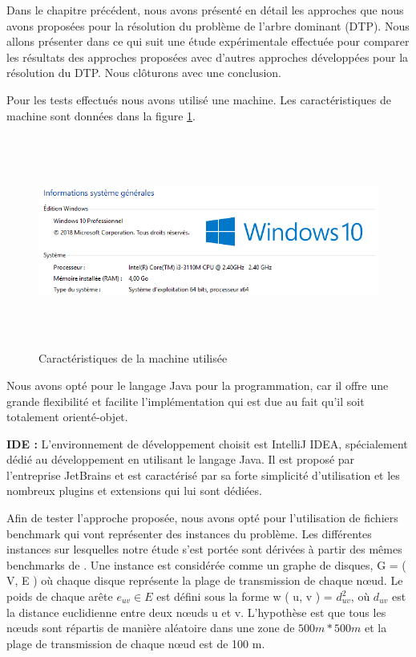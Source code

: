 


Dans le chapitre précédent, nous avons présenté en détail les approches que nous avons proposées pour la résolution du problème de l’arbre dominant (DTP). Nous allons présenter dans ce qui suit une étude expérimentale effectuée pour comparer les résultats des approches proposées avec d’autres approches développées pour la résolution du DTP. Nous clôturons avec une conclusion.



Pour les tests effectués nous avons utilisé une machine. Les caractéristiques de  machine sont données dans la figure \ref{fig:CMU}.

\begin{figure}[H]
	\centering
	\includegraphics[width=16cm,height=7cm]{Chap5/1.png}
	\caption{Caractéristiques de la machine utilisée}
	\label{fig:CMU}
\end{figure}

Nous avons opté pour le langage Java pour la programmation, car il offre une grande flexibilité et facilite l’implémentation qui est due au fait qu’il soit totalement orienté-objet.

\textbf{IDE :}
L’environnement de développement choisit est IntelliJ IDEA, spécialement dédié au développement en utilisant le langage Java. Il est proposé par l’entreprise JetBrains et est caractérisé par sa forte simplicité d’utilisation et les nombreux plugins et extensions qui lui sont dédiées.

Afin de tester l'approche proposée, nous avons opté pour l'utilisation de fichiers benchmark qui vont représenter des instances du problème. Les différentes instances sur lesquelles notre étude s'est portée sont dérivées à partir des mêmes benchmarks de \cite{sundar2013new}. Une instance est considérée comme un graphe de disques, G = ( V, E ) où chaque disque représente la plage de transmission de chaque nœud. Le poids de chaque arête $e_{uv} \in E $ est défini sous la forme w ( u, v ) = $d_{uv}^2$, où $d_{uv}$  est la distance euclidienne entre deux nœuds u et v. L'hypothèse est que tous les nœuds sont répartis de manière aléatoire dans une zone de $500m * 500m $  et la plage de transmission de chaque nœud est de 100 m.


